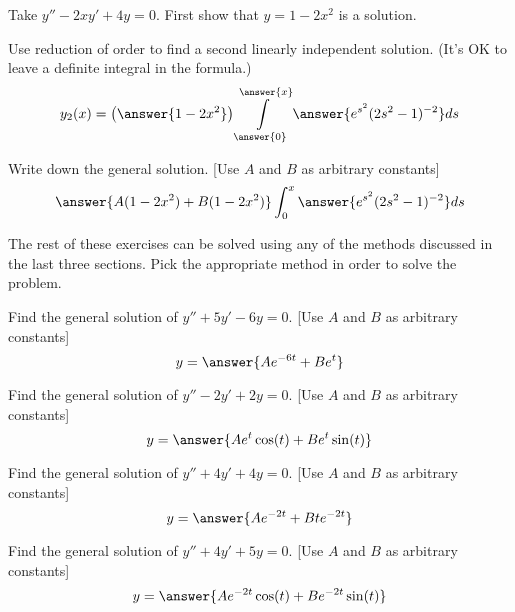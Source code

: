\documentclass{ximera}
\begin{document}
\begin{exercise}%
    Take $y''-2xy' + 4y = 0$.
    First show that $y=1-2x^2$ is a solution.  
    \begin{problem}
        Use reduction of order to find a second linearly independent solution. (It's OK to leave a definite integral in the formula.)
        \[
            y_2(x) = \left(\answer{1-2x^2}\right)\int\limits_{\answer{0}}^{\answer{x}} \answer{e^{s^2}(2s^2 - 1)^{-2}}ds
        \]
        \begin{problem}
            Write down the general solution. [Use $A$ and $B$ as arbitrary constants]
            \[
                \answer{A(1-2x^2) + B(1-2x^2)}\int_0^x\answer{e^{s^2}(2s^2 - 1)^{-2}} ds
            \]
        \end{problem}
    \end{problem}
\end{exercise}

\noindent The rest of these exercises can be solved using any of the methods discussed in the last three sections. Pick the appropriate method in order to solve the problem.

\begin{exercise}
    Find the general solution of $y'' + 5y' - 6y = 0$. [Use $A$ and $B$ as arbitrary constants]
    \[
        y = \answer{Ae^{-6t} + Be^t}
    \]
\end{exercise}

\begin{exercise}
    Find the general solution of $y'' - 2y' + 2y = 0$. [Use $A$ and $B$ as arbitrary constants]
    \[
        y = \answer{Ae^t\cos(t) + Be^t\sin(t)}
    \]
\end{exercise}

\begin{exercise}
    Find the general solution of $y'' + 4y' + 4y = 0$. [Use $A$ and $B$ as arbitrary constants]
    \[
        y = \answer{Ae^{-2t} + Bte^{-2t}}
    \]
\end{exercise}

\begin{exercise}
    Find the general solution of $y'' + 4y' + 5y = 0$. [Use $A$ and $B$ as arbitrary constants]
    \[
        y = \answer{Ae^{-2t}\cos(t) + Be^{-2t}\sin(t)}
    \]
\end{exercise}
\end{document}
